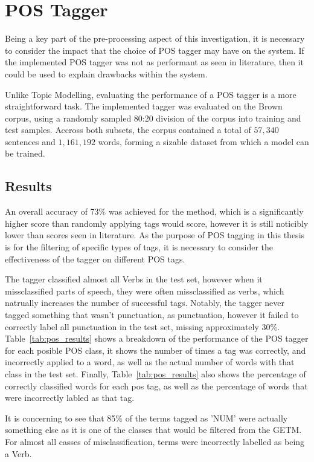 \documentclass[10pt]{report}
\begin{document}
\clearpage
\section{POS Tagger}
Being a key part of the pre-processing aspect of this investigation, it is necessary to consider the impact that the choice of POS tagger may have on the system. If the implemented POS tagger was not as performant as seen in literature, then it could be used to explain drawbacks within the system.

Unlike Topic Modelling, evaluating the performance of a POS tagger is a more straightforward task. The implemented tagger was evaluated on the Brown corpus, using a randomly sampled 80:20 division of the corpus into training and test samples. Accross both subsets, the corpus contained a total of $57,340$ sentences and $1,161,192$ words, forming a sizable dataset from which a model can be trained.


\subsection{Results}
An overall accuracy of 73\% was achieved for the method, which is a significantly higher score than randomly applying tags would score, however it is still noticibly lower than scores seen in literature. As the purpose of POS tagging in this thesis is for the filtering of specific types of tags, it is necessary to consider the effectiveness of the tagger on different POS tags.

The tagger classified almost all Verbs in the test set, however when it missclassified parts of speech, they were often missclassified as verbs, which natrually increases the number of successful tags. Notably, the tagger never tagged something that wasn't punctuation, as punctuation, however it failed to correctly label all punctuation in the test set, missing approximately 30\%. Table~\ref{tab:pos_results} shows a breakdown of the performance of the POS tagger for each posible POS class, it shows the number of times a tag was correctly, and incorrectly applied to a word, as well as the actual number of words with that class in the test set. Finally, Table~\ref{tab:pos_results} also shows the percentage of correctly classified words for each pos tag, as well as the percentage of words that were incorrectly labled as that tag.

It is concerning to see that 85\% of the terms tagged as 'NUM' were actually something else as it is one of the classes that would be filtered from the GETM. For almost all casses of misclassification, terms were incorrectly labelled as being a Verb.
\end{document}
